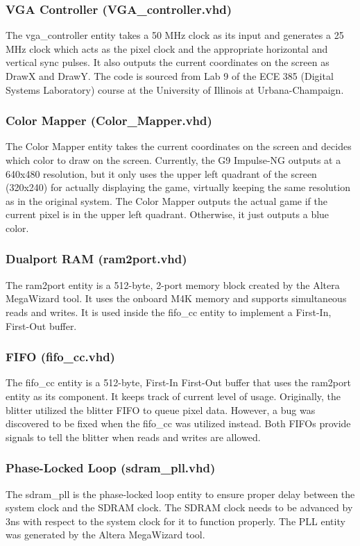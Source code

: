 \documentclass{report}
\begin{document}
\subsubsection{VGA Controller (VGA\_controller.vhd)}
The vga\_controller entity takes a 50 MHz clock as its input and 
generates a 25 MHz clock which acts as the pixel clock and the 
appropriate horizontal and vertical sync pulses. It also outputs the 
current coordinates on the screen as DrawX and DrawY. The code is 
sourced from Lab 9 of the ECE 385 (Digital Systems Laboratory) course at 
the University of Illinois at Urbana-Champaign.

\subsubsection{Color Mapper (Color\_Mapper.vhd)}
The Color Mapper entity takes the current coordinates on the screen and 
decides which color to draw on the screen. Currently, the G9 Impulse-NG 
outputs at a 640x480 resolution, but it only uses the upper left
quadrant of the screen (320x240) for actually displaying the game,
virtually keeping the same resolution as in the original system. The 
Color Mapper outputs the actual game if the current pixel is in the 
upper left quadrant. Otherwise, it just outputs a blue color.

\subsubsection{Dualport RAM (ram2port.vhd)}
The ram2port entity is a 512-byte, 2-port memory block created by the 
Altera MegaWizard tool. It uses the onboard M4K memory and supports 
simultaneous reads and writes. It is used inside the fifo\_cc entity to 
implement a First-In, First-Out buffer.

\subsubsection{FIFO (fifo\_cc.vhd)}
The fifo\_cc entity is a 512-byte, First-In First-Out buffer that uses 
the ram2port entity as its component. It keeps track of current level of 
usage. Originally, the blitter utilized the blitter FIFO to queue pixel 
data. However, a bug was discovered to be fixed when the fifo\_cc was 
utilized instead. Both FIFOs provide signals to tell the blitter when 
reads and writes are allowed.

\subsubsection{Phase-Locked Loop (sdram\_pll.vhd)}
The sdram\_pll is the phase-locked loop entity to ensure proper delay 
between the system clock and the SDRAM clock. The SDRAM clock needs to 
be advanced by 3ns with respect to the system clock for it to function 
properly. The PLL entity was generated by the Altera MegaWizard tool.
\end{document}
